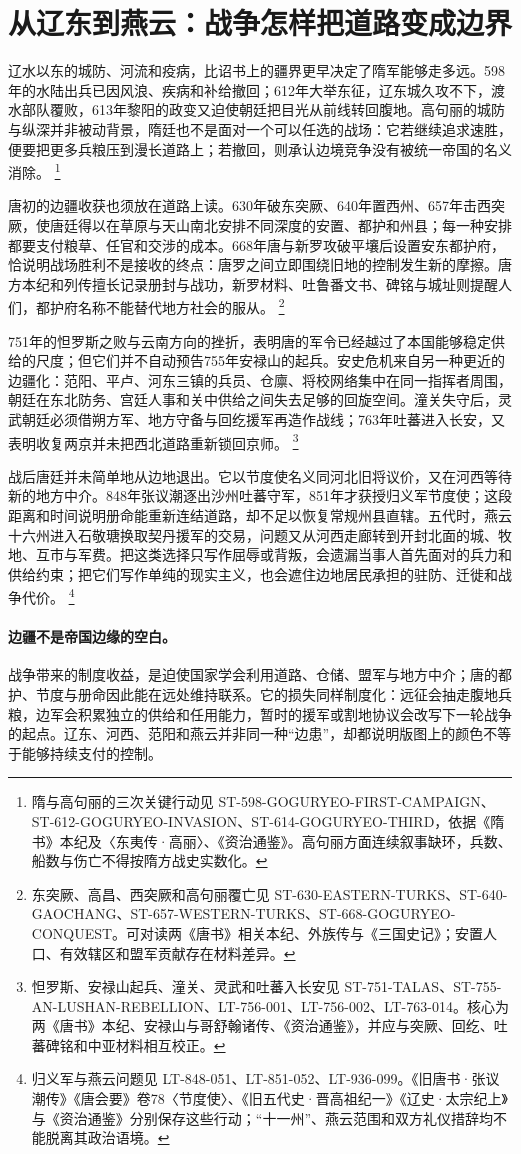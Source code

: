 \section{从辽东到燕云：战争怎样把道路变成边界}
\label{sec:frontier-war}

辽水以东的城防、河流和疫病，比诏书上的疆界更早决定了隋军能够走多远。598年的水陆出兵已因风浪、疾病和补给撤回；612年大举东征，辽东城久攻不下，渡水部队覆败，613年黎阳的政变又迫使朝廷把目光从前线转回腹地。高句丽的城防与纵深并非被动背景，隋廷也不是面对一个可以任选的战场：它若继续追求速胜，便要把更多兵粮压到漫长道路上；若撤回，则承认边境竞争没有被统一帝国的名义消除。%
\footnote{隋与高句丽的三次关键行动见 ST-598-GOGURYEO-FIRST-CAMPAIGN、ST-612-GOGURYEO-INVASION、ST-614-GOGURYEO-THIRD，依据《隋书》本纪及〈东夷传·高丽〉、《资治通鉴》。高句丽方面连续叙事缺环，兵数、船数与伤亡不得按隋方战史实数化。}

唐初的边疆收获也须放在道路上读。630年破东突厥、640年置西州、657年击西突厥，使唐廷得以在草原与天山南北安排不同深度的安置、都护和州县；每一种安排都要支付粮草、任官和交涉的成本。668年唐与新罗攻破平壤后设置安东都护府，恰说明战场胜利不是接收的终点：唐罗之间立即围绕旧地的控制发生新的摩擦。唐方本纪和列传擅长记录册封与战功，新罗材料、吐鲁番文书、碑铭与城址则提醒人们，都护府名称不能替代地方社会的服从。%
\footnote{东突厥、高昌、西突厥和高句丽覆亡见 ST-630-EASTERN-TURKS、ST-640-GAOCHANG、ST-657-WESTERN-TURKS、ST-668-GOGURYEO-CONQUEST。可对读两《唐书》相关本纪、外族传与《三国史记》；安置人口、有效辖区和盟军贡献存在材料差异。}

751年的怛罗斯之败与云南方向的挫折，表明唐的军令已经越过了本国能够稳定供给的尺度；但它们并不自动预告755年安禄山的起兵。安史危机来自另一种更近的边疆化：范阳、平卢、河东三镇的兵员、仓廪、将校网络集中在同一指挥者周围，朝廷在东北防务、宫廷人事和关中供给之间失去足够的回旋空间。潼关失守后，灵武朝廷必须借朔方军、地方守备与回纥援军再造作战线；763年吐蕃进入长安，又表明收复两京并未把西北道路重新锁回京师。%
\footnote{怛罗斯、安禄山起兵、潼关、灵武和吐蕃入长安见 ST-751-TALAS、ST-755-AN-LUSHAN-REBELLION、LT-756-001、LT-756-002、LT-763-014。核心为两《唐书》本纪、安禄山与哥舒翰诸传、《资治通鉴》，并应与突厥、回纥、吐蕃碑铭和中亚材料相互校正。}

战后唐廷并未简单地从边地退出。它以节度使名义同河北旧将议价，又在河西等待新的地方中介。848年张议潮逐出沙州吐蕃守军，851年才获授归义军节度使；这段距离和时间说明册命能重新连结道路，却不足以恢复常规州县直辖。五代时，燕云十六州进入石敬瑭换取契丹援军的交易，问题又从河西走廊转到开封北面的城、牧地、互市与军费。把这类选择只写作屈辱或背叛，会遗漏当事人首先面对的兵力和供给约束；把它们写作单纯的现实主义，也会遮住边地居民承担的驻防、迁徙和战争代价。%
\footnote{归义军与燕云问题见 LT-848-051、LT-851-052、LT-936-099。《旧唐书·张议潮传》《唐会要》卷78〈节度使〉、《旧五代史·晋高祖纪一》《辽史·太宗纪上》与《资治通鉴》分别保存这些行动；“十一州”、燕云范围和双方礼仪措辞均不能脱离其政治语境。}

\paragraph{边疆不是帝国边缘的空白。}
战争带来的制度收益，是迫使国家学会利用道路、仓储、盟军与地方中介；唐的都护、节度与册命因此能在远处维持联系。它的损失同样制度化：远征会抽走腹地兵粮，边军会积累独立的供给和任用能力，暂时的援军或割地协议会改写下一轮战争的起点。辽东、河西、范阳和燕云并非同一种“边患”，却都说明版图上的颜色不等于能够持续支付的控制。
